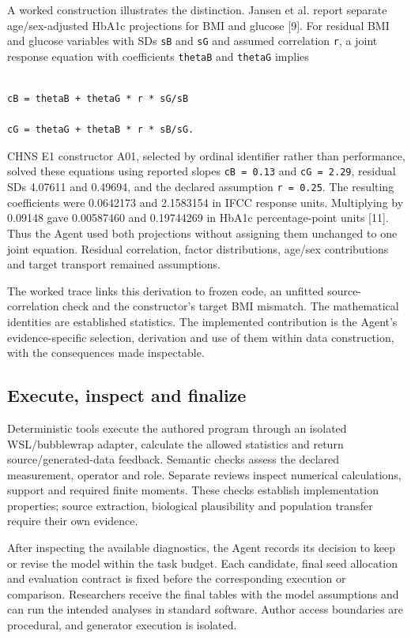 \documentclass[10pt,twocolumn]{article}
\begin{document}
A worked construction illustrates the distinction. Jansen et al. report separate age/sex-adjusted HbA1c projections for BMI and glucose [9]. For residual BMI and glucose variables with SDs \texttt{sB} and \texttt{sG} and assumed correlation \texttt{r}, a joint response equation with coefficients \texttt{thetaB} and \texttt{thetaG} implies


\begin{lstlisting}

cB = thetaB + thetaG * r * sG/sB

cG = thetaG + thetaB * r * sB/sG.

\end{lstlisting}

CHNS E1 constructor A01, selected by ordinal identifier rather than performance, solved these equations using reported slopes \texttt{cB = 0.13} and \texttt{cG = 2.29}, residual SDs 4.07611 and 0.49694, and the declared assumption \texttt{r = 0.25}. The resulting coefficients were 0.0642173 and 2.1583154 in IFCC response units. Multiplying by 0.09148 gave 0.00587460 and 0.19744269 in HbA1c percentage-point units [11]. Thus the Agent used both projections without assigning them unchanged to one joint equation. Residual correlation, factor distributions, age/sex contributions and target transport remained assumptions.


The worked trace links this derivation to frozen code, an unfitted source-correlation check and the constructor's target BMI mismatch. The mathematical identities are established statistics. The implemented contribution is the Agent's evidence-specific selection, derivation and use of them within data construction, with the consequences made inspectable.


\subsection{Execute, inspect and finalize}

Deterministic tools execute the authored program through an isolated WSL/bubblewrap adapter, calculate the allowed statistics and return source/generated-data feedback. Semantic checks assess the declared measurement, operator and role. Separate reviews inspect numerical calculations, support and required finite moments. These checks establish implementation properties; source extraction, biological plausibility and population transfer require their own evidence.


After inspecting the available diagnostics, the Agent records its decision to keep or revise the model within the task budget. Each candidate, final seed allocation and evaluation contract is fixed before the corresponding execution or comparison. Researchers receive the final tables with the model assumptions and can run the intended analyses in standard software. Author access boundaries are procedural, and generator execution is isolated.
\end{document}
